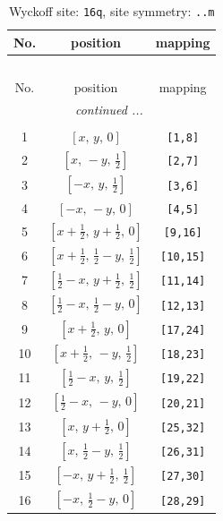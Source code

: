 \documentclass[fleqn,8pt]{jsarticle}
\begin{document}
\renewcommand{\arraystretch}{1.2}
\begin{longtable}{ccc}
\caption{Wyckoff site: {\tt 16q}, site symmetry: {\tt ..m}}
 \\
 \hline \hline
No. & position & mapping \\ \hline \endfirsthead

\multicolumn{2}{l}{\tablename\ \thetable{}} \\
 \hline \hline
No. & position & mapping \\ \hline \endhead

 \hline \hline
\multicolumn{2}{r}{\footnotesize\it continued ...} \\ \endfoot

 \hline \hline
\multicolumn{2}{r}{} \\ \endlastfoot

1 & $\left[ x,\, y,\, 0 \right]$ & {\tt [1,8]} \\ \hline
2 & $\left[ x,\, - y,\, \frac{1}{2} \right]$ & {\tt [2,7]} \\ \hline
3 & $\left[ - x,\, y,\, \frac{1}{2} \right]$ & {\tt [3,6]} \\ \hline
4 & $\left[ - x,\, - y,\, 0 \right]$ & {\tt [4,5]} \\ \hline
5 & $\left[ x + \frac{1}{2},\, y + \frac{1}{2},\, 0 \right]$ & {\tt [9,16]} \\ \hline
6 & $\left[ x + \frac{1}{2},\, \frac{1}{2} - y,\, \frac{1}{2} \right]$ & {\tt [10,15]} \\ \hline
7 & $\left[ \frac{1}{2} - x,\, y + \frac{1}{2},\, \frac{1}{2} \right]$ & {\tt [11,14]} \\ \hline
8 & $\left[ \frac{1}{2} - x,\, \frac{1}{2} - y,\, 0 \right]$ & {\tt [12,13]} \\ \hline
9 & $\left[ x + \frac{1}{2},\, y,\, 0 \right]$ & {\tt [17,24]} \\ \hline
10 & $\left[ x + \frac{1}{2},\, - y,\, \frac{1}{2} \right]$ & {\tt [18,23]} \\ \hline
11 & $\left[ \frac{1}{2} - x,\, y,\, \frac{1}{2} \right]$ & {\tt [19,22]} \\ \hline
12 & $\left[ \frac{1}{2} - x,\, - y,\, 0 \right]$ & {\tt [20,21]} \\ \hline
13 & $\left[ x,\, y + \frac{1}{2},\, 0 \right]$ & {\tt [25,32]} \\ \hline
14 & $\left[ x,\, \frac{1}{2} - y,\, \frac{1}{2} \right]$ & {\tt [26,31]} \\ \hline
15 & $\left[ - x,\, y + \frac{1}{2},\, \frac{1}{2} \right]$ & {\tt [27,30]} \\ \hline
16 & $\left[ - x,\, \frac{1}{2} - y,\, 0 \right]$ & {\tt [28,29]} \\
\end{longtable}
\end{document}
